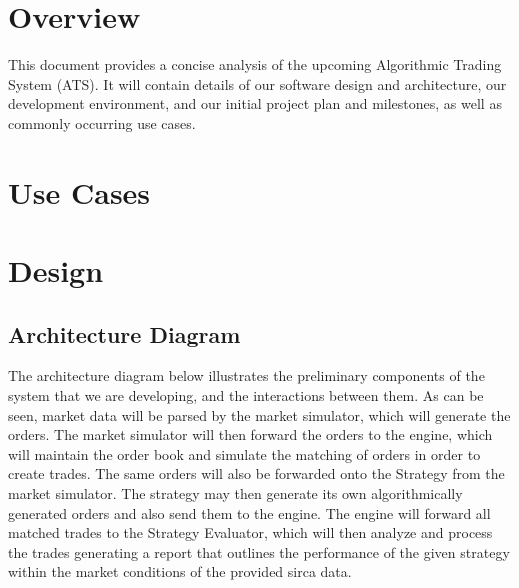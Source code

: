 \documentclass{article}
\begin{document}
\maketitle


\section{Overview}
This document provides a concise analysis of the upcoming Algorithmic Trading System (ATS). It will contain details of our software design and architecture, our development environment, and our initial project plan and milestones, as well as commonly occurring use cases.


\section{Use Cases}


\section{Design}
\subsection{Architecture Diagram}

The architecture diagram below illustrates the preliminary components of the system that we are developing, and the interactions between them. As can be seen, market data will be parsed by the market simulator, which will generate the orders. The market simulator will then forward the orders to the engine, which will maintain the order book and simulate the matching of orders in order to create trades. The same orders will also be forwarded onto the Strategy from the market simulator. The strategy may then generate its own algorithmically generated orders and also send them to the engine. The engine will forward all matched trades to the Strategy Evaluator, which will then analyze and process the trades generating a report that outlines the performance of the given strategy within the market conditions of the provided sirca data.
\end{document}
